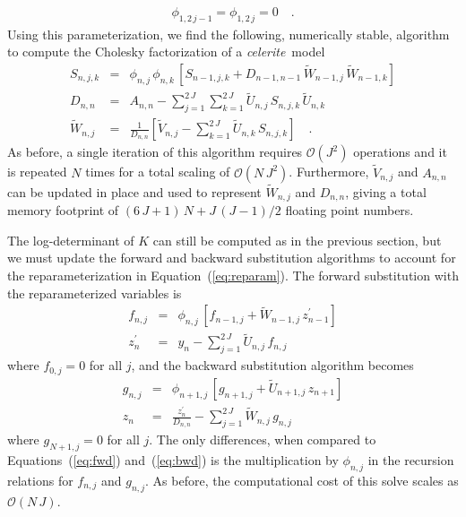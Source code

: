 \documentclass[manuscript, letterpaper]{aastex6}
\newcommand{\celeriteterm}{\emph{celerite}}
\renewcommand{\eqref}[1]{\ref{eq:#1}}
\newcommand{\Eq}[1]{Equation~(\eqref{#1})}
\newcommand{\eq}[1]{\Eq{#1}}
\begin{document}
\begin{eqnarray}
\phi_{1,2\,j-1} = \phi_{1,2\,j} = 0 \quad.
\end{eqnarray}
Using this parameterization, we find the following, numerically stable,
algorithm to compute the Cholesky factorization of a \celeriteterm\ model
\begin{eqnarray}
    S_{n,j,k} &=& \phi_{n,j}\,\phi_{n,k}\,\left[S_{n-1,j,k} +
    D_{n-1,n-1}\,\tilde{W}_{n-1,j}\,\tilde{W}_{n-1,k}\right] \nonumber\\
D_{n,n} &=& A_{n,n} -
    \sum_{j=1}^{2\,J}\sum_{k=1}^{2\,J} \tilde{U}_{n,j}\,S_{n,j,k}\,\tilde{U}_{n,k}
    \nonumber\\
\tilde{W}_{n,j} &=& \frac{1}{D_{n,n}}\left[ \tilde{V}_{n,j} -
    \sum_{k=1}^{2\,J}\tilde{U}_{n,k}\,S_{n,j,k} \right] \quad.
\end{eqnarray}
As before, a single iteration of this algorithm requires $\mathcal{O}(J^2)$
operations and it is repeated $N$ times for a total scaling of
$\mathcal{O}(N\,J^2)$.
Furthermore, $\tilde{V}_{n,j}$ and $A_{n,n}$ can be updated in place and used
to represent $\tilde{W}_{n,j}$ and $D_{n,n}$, giving a total memory footprint
of $(6\,J + 1)\,N + J\,(J-1)/2$ floating point numbers.

The log-determinant of $K$ can still be computed as in the previous section,
but we must update the forward and backward substitution algorithms to account
for the reparameterization in \eq{reparam}.
The forward substitution with the reparameterized variables is
\begin{eqnarray}
    f_{n,j} &=& \phi_{n,j}\,\left[f_{n-1,j} +
    \tilde{W}_{n-1,j}\,z_{n-1}^\prime\right] \nonumber\\
    z_n^\prime &=& y_n - \sum_{j=1}^{2\,J} \tilde{U}_{n,j}\,f_{n,j}
\end{eqnarray}
where $f_{0,j} = 0$ for all $j$, and the backward substitution algorithm
becomes
\begin{eqnarray}
g_{n,j} &=& \phi_{n+1,j}\,\left[g_{n+1,j} +
    \tilde{U}_{n+1,j}\,z_{n+1}\right] \nonumber\\
z_n &=& \frac{z_n^\prime}{D_{n,n}} - \sum_{j=1}^{2\,J} \tilde{W}_{n,j}\,g_{n,j}
\end{eqnarray}
where $g_{N+1,j} = 0$ for all $j$.
The only differences, when compared to Equations~(\eqref{fwd})
and~(\eqref{bwd}) is the multiplication by $\phi_{n,j}$ in the recursion
relations for $f_{n,j}$ and $g_{n,j}$.
As before, the computational cost of this solve scales as $\mathcal{O}(N\,J)$.
\end{document}

